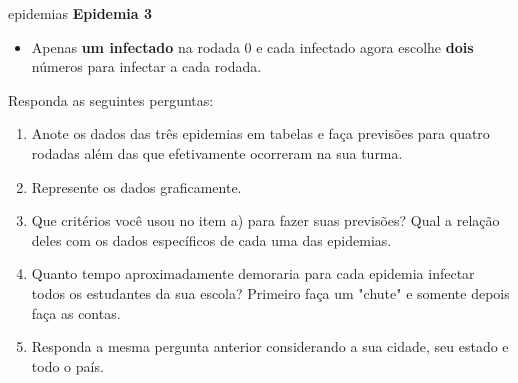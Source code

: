 \begin{task}{epidemias}
\textbf{Epidemia 3}
\begin{itemize}
\item Apenas \textbf{um infectado} na rodada 0 e cada infectado agora escolhe \textbf{dois} números para infectar a cada rodada.
\end{itemize}

Responda as seguintes perguntas:

\begin{enumerate}
\item Anote os dados das três epidemias em tabelas e faça previsões para quatro rodadas além das que efetivamente ocorreram na sua turma.
\item Represente os dados graficamente.
\item Que critérios você usou no item a) para fazer suas previsões? Qual a relação deles com os dados específicos de cada uma das epidemias.
\item Quanto tempo aproximadamente demoraria para cada epidemia infectar todos os estudantes da sua escola? Primeiro faça um "chute" e somente depois faça as contas.
\item Responda a mesma pergunta anterior considerando a sua cidade, seu estado e todo o país.
\end{enumerate}
\end{task}


